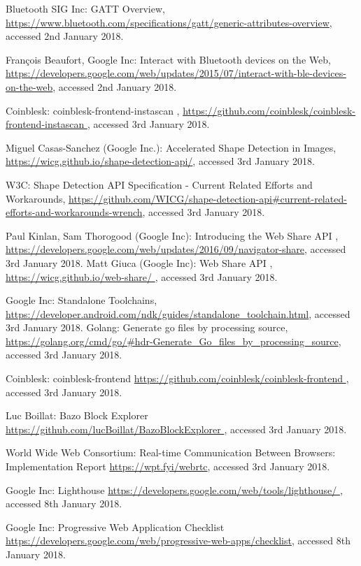 \begin{thebibliography}{99}
Bluetooth SIG Inc: GATT Overview, \url{https://www.bluetooth.com/specifications/gatt/generic-attributes-overview}, accessed 2nd January 2018.

François Beaufort, Google Inc: Interact with Bluetooth devices on the Web, \url{https://developers.google.com/web/updates/2015/07/interact-with-ble-devices-on-the-web}, accessed 2nd January 2018.

Coinblesk: coinblesk-frontend-instascan
, \url{https://github.com/coinblesk/coinblesk-frontend-instascan
}, accessed 3rd January 2018.

Miguel Casas-Sanchez (Google Inc.): Accelerated Shape Detection in Images, \url{https://wicg.github.io/shape-detection-api/}, accessed 3rd January 2018.

W3C: Shape Detection API Specification 
- Current Related Efforts and Workarounds, \url{https://github.com/WICG/shape-detection-api#current-related-efforts-and-workarounds-wrench}, accessed 3rd January 2018.

 Paul Kinlan, Sam Thorogood (Google Inc): Introducing the Web Share API
, \url{https://developers.google.com/web/updates/2016/09/navigator-share}, accessed 3rd January 2018.
 Matt Giuca (Google Inc): Web Share API
, \url{https://wicg.github.io/web-share/
}, accessed 3rd January 2018.

 Google Inc: Standalone Toolchains, \url{https://developer.android.com/ndk/guides/standalone_toolchain.html}, accessed 3rd January 2018.
 Golang: Generate go files by processing source, \url{https://golang.org/cmd/go/#hdr-Generate_Go_files_by_processing_source}, accessed 3rd January 2018.

 Coinblesk: coinblesk-frontend \url{https://github.com/coinblesk/coinblesk-frontend
}, accessed 3rd January 2018.

 Luc Boillat: Bazo Block Explorer \url{https://github.com/lucBoillat/BazoBlockExplorer
}, accessed 3rd January 2018.

 World Wide Web Consortium: Real-time Communication Between Browsers: Implementation Report \url{https://wpt.fyi/webrtc}, accessed 3rd January 2018.

 Google Inc: Lighthouse \url{https://developers.google.com/web/tools/lighthouse/
}, accessed 8th January 2018.

 Google Inc: Progressive Web Application Checklist \url{https://developers.google.com/web/progressive-web-apps/checklist}, accessed 8th January 2018.


\end{thebibliography}



